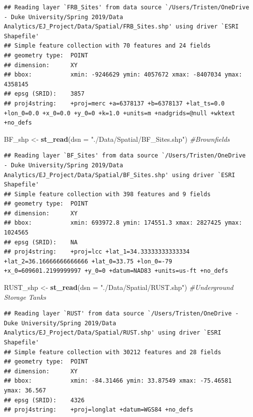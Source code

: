 \documentclass[12pt,]{article}
\newenvironment{Shaded}{\begin{snugshade}}{\end{snugshade}}
\newcommand{\KeywordTok}[1]{\textcolor[rgb]{0.13,0.29,0.53}{\textbf{#1}}}
\newcommand{\DataTypeTok}[1]{\textcolor[rgb]{0.13,0.29,0.53}{#1}}
\newcommand{\StringTok}[1]{\textcolor[rgb]{0.31,0.60,0.02}{#1}}
\newcommand{\CommentTok}[1]{\textcolor[rgb]{0.56,0.35,0.01}{\textit{#1}}}
\newcommand{\NormalTok}[1]{#1}
\begin{document}
\begin{verbatim}
## Reading layer `FRB_Sites' from data source `/Users/Tristen/OneDrive - Duke University/Spring 2019/Data Analytics/EJ_Project/Data/Spatial/FRB_Sites.shp' using driver `ESRI Shapefile'
## Simple feature collection with 70 features and 24 fields
## geometry type:  POINT
## dimension:      XY
## bbox:           xmin: -9246629 ymin: 4057672 xmax: -8407034 ymax: 4358145
## epsg (SRID):    3857
## proj4string:    +proj=merc +a=6378137 +b=6378137 +lat_ts=0.0 +lon_0=0.0 +x_0=0.0 +y_0=0 +k=1.0 +units=m +nadgrids=@null +wktext +no_defs
\end{verbatim}

\begin{Shaded}
\begin{Highlighting}[]
\NormalTok{BF_shp <-}\StringTok{ }\KeywordTok{st_read}\NormalTok{(}\DataTypeTok{dsn =} \StringTok{"./Data/Spatial/BF_Sites.shp"}\NormalTok{) }\CommentTok{#Brownfields}
\end{Highlighting}
\end{Shaded}

\begin{verbatim}
## Reading layer `BF_Sites' from data source `/Users/Tristen/OneDrive - Duke University/Spring 2019/Data Analytics/EJ_Project/Data/Spatial/BF_Sites.shp' using driver `ESRI Shapefile'
## Simple feature collection with 398 features and 9 fields
## geometry type:  POINT
## dimension:      XY
## bbox:           xmin: 693972.8 ymin: 174551.3 xmax: 2827425 ymax: 1024565
## epsg (SRID):    NA
## proj4string:    +proj=lcc +lat_1=34.33333333333334 +lat_2=36.16666666666666 +lat_0=33.75 +lon_0=-79 +x_0=609601.2199999997 +y_0=0 +datum=NAD83 +units=us-ft +no_defs
\end{verbatim}

\begin{Shaded}
\begin{Highlighting}[]
\NormalTok{RUST_shp <-}\StringTok{ }\KeywordTok{st_read}\NormalTok{(}\DataTypeTok{dsn =} \StringTok{"./Data/Spatial/RUST.shp"}\NormalTok{) }\CommentTok{#Underground Storage Tanks}
\end{Highlighting}
\end{Shaded}

\begin{verbatim}
## Reading layer `RUST' from data source `/Users/Tristen/OneDrive - Duke University/Spring 2019/Data Analytics/EJ_Project/Data/Spatial/RUST.shp' using driver `ESRI Shapefile'
## Simple feature collection with 30212 features and 28 fields
## geometry type:  POINT
## dimension:      XY
## bbox:           xmin: -84.31466 ymin: 33.87549 xmax: -75.46581 ymax: 36.567
## epsg (SRID):    4326
## proj4string:    +proj=longlat +datum=WGS84 +no_defs
\end{verbatim}
\end{document}
